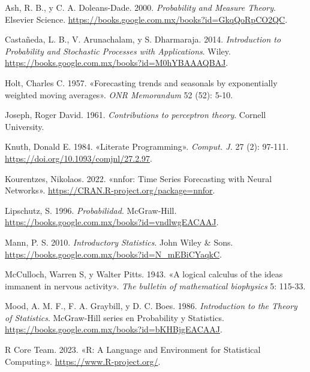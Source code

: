 \documentclass[
  letterpaper,
  DIV=11,
  numbers=noendperiod]{scrreport}
\newlength{\cslhangindent}
\newenvironment{CSLReferences}[2] %
 {\begin{list}{}{%
  \setlength{\itemindent}{0pt}
  \setlength{\leftmargin}{0pt}
  \setlength{\parsep}{0pt}
  \ifodd #1
   \setlength{\leftmargin}{\cslhangindent}
   \setlength{\itemindent}{-1\cslhangindent}
  \fi
  \setlength{\itemsep}{#2\baselineskip}}}
 {\end{list}}
\theoremstyle{plain}
\theoremstyle{definition}
\theoremstyle{definition}
\theoremstyle{plain}
\theoremstyle{remark}
\begin{document}
\label{refs}
\begin{CSLReferences}{1}{0}
Ash, R. B., y C. A. Doleans-Dade. 2000. \emph{Probability and Measure
Theory}. Elsevier Science.
\url{https://books.google.com.mx/books?id=GkqQoRpCO2QC}.

Castañeda, L. B., V. Arunachalam, y S. Dharmaraja. 2014.
\emph{Introduction to Probability and Stochastic Processes with
Applications}. Wiley.
\url{https://books.google.com.mx/books?id=M0hYBAAAQBAJ}.

Holt, Charles C. 1957. {«Forecasting trends and seasonals by
exponentially weighted moving averages»}. \emph{ONR Memorandum} 52 (52):
5-10.

Joseph, Roger David. 1961. \emph{Contributions to perceptron theory}.
Cornell University.

Knuth, Donald E. 1984. {«Literate Programming»}. \emph{Comput. J.} 27
(2): 97-111. \url{https://doi.org/10.1093/comjnl/27.2.97}.

Kourentzes, Nikolaos. 2022. {«nnfor: Time Series Forecasting with Neural
Networks»}. \url{https://CRAN.R-project.org/package=nnfor}.

Lipschutz, S. 1996. \emph{Probabilidad}. McGraw-Hill.
\url{https://books.google.com.mx/books?id=vndlwgEACAAJ}.

Mann, P. S. 2010. \emph{Introductory Statistics}. John Wiley \& Sons.
\url{https://books.google.com.mx/books?id=N_mEBiCYaqkC}.

McCulloch, Warren S, y Walter Pitts. 1943. {«A logical calculus of the
ideas immanent in nervous activity»}. \emph{The bulletin of mathematical
biophysics} 5: 115-33.

Mood, A. M. F., F. A. Graybill, y D. C. Boes. 1986. \emph{Introduction
to the Theory of Statistics}. McGraw-Hill series en Probability y
Statistics. \url{https://books.google.com.mx/books?id=bKHBjgEACAAJ}.

R Core Team. 2023. {«R: A Language and Environment for Statistical
Computing»}. \url{https://www.R-project.org/}.


\end{CSLReferences}
\end{document}
